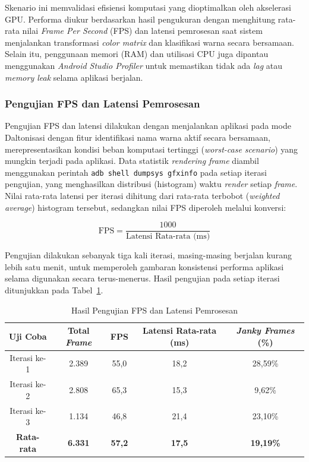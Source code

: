 Skenario ini memvalidasi efisiensi komputasi yang dioptimalkan oleh akselerasi GPU.
Performa diukur berdasarkan hasil pengukuran dengan menghitung rata-rata nilai \textit{Frame Per Second} (FPS) dan latensi pemrosesan saat sistem menjalankan transformasi \textit{color matrix} dan klasifikasi warna secara bersamaan.
Selain itu, penggunaan memori (RAM) dan utilisasi CPU juga dipantau menggunakan \textit{Android Studio Profiler} untuk memastikan tidak ada \textit{lag} atau \textit{memory leak} selama aplikasi berjalan.

\subsubsection{Pengujian FPS dan Latensi Pemrosesan}

Pengujian FPS dan latensi dilakukan dengan menjalankan aplikasi pada mode Daltonisasi dengan fitur identifikasi nama warna aktif secara bersamaan, merepresentasikan kondisi beban komputasi tertinggi (\textit{worst-case scenario}) yang mungkin terjadi pada aplikasi.
Data statistik \textit{rendering frame} diambil menggunakan perintah \texttt{adb shell dumpsys gfxinfo} pada setiap iterasi pengujian, yang menghasilkan distribusi (histogram) waktu \textit{render} setiap \textit{frame}.
Nilai rata-rata latensi per iterasi dihitung dari rata-rata terbobot (\textit{weighted average}) histogram tersebut, sedangkan nilai FPS diperoleh melalui konversi:

\begin{equation}
  \text{FPS} = \frac{1000}{\text{Latensi Rata-rata (ms)}}
  \label{eq:fps}
\end{equation}

Pengujian dilakukan sebanyak tiga kali iterasi, masing-masing berjalan kurang lebih satu menit, untuk memperoleh gambaran konsistensi performa aplikasi selama digunakan secara terus-menerus.
Hasil pengujian pada setiap iterasi ditunjukkan pada Tabel~\ref{tab:performa-fps}.

\begin{table}[H]
  \centering
  \caption{Hasil Pengujian FPS dan Latensi Pemrosesan}
  \label{tab:performa-fps}
  \begin{tabular}{|c|c|c|c|c|}
    \hline
    Uji Coba & Total \textit{Frame} & FPS & Latensi Rata-rata (ms) & \textit{Janky Frames} (\%) \\
    \hline
    Iterasi ke-1 & 2.389 & 55,0 & 18,2 & 28,59\% \\
    \hline
    Iterasi ke-2 & 2.808 & 65,3 & 15,3 & 9,62\% \\
    \hline
    Iterasi ke-3 & 1.134 & 46,8 & 21,4 & 23,10\% \\
    \hline
    \textbf{Rata-rata} & \textbf{6.331} & \textbf{57,2} & \textbf{17,5} & \textbf{19,19\%} \\
    \hline
  \end{tabular}
\end{table}

